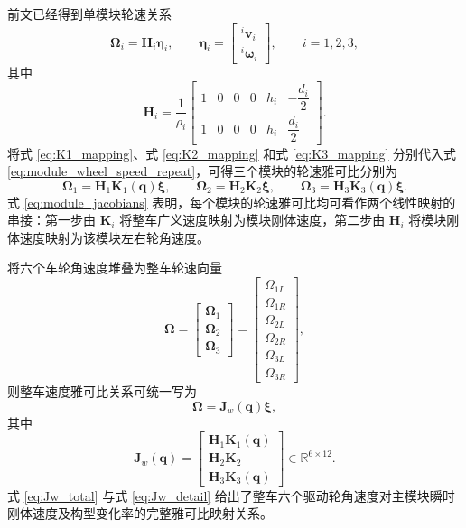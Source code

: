 前文已经得到单模块轮速关系
\begin{equation}
\boldsymbol\Omega_i=\mathbf H_i\boldsymbol\eta_i,
\qquad
\boldsymbol\eta_i=
\begin{bmatrix}
{}^{i}\mathbf v_i\\
{}^{i}\boldsymbol\omega_i
\end{bmatrix},
\qquad i=1,2,3,
\label{eq:module_wheel_speed_repeat}
\end{equation}
其中
\begin{equation}
\mathbf H_i
=
\frac{1}{\rho_i}
\begin{bmatrix}
1 & 0 & 0 & 0 & h_i & -\dfrac{d_i}{2}\\[4pt]
1 & 0 & 0 & 0 & h_i & \dfrac{d_i}{2}
\end{bmatrix}.
\label{eq:Hi_repeat}
\end{equation}
将式 \eqref{eq:K1_mapping}、式 \eqref{eq:K2_mapping} 和式 \eqref{eq:K3_mapping} 分别代入式 \eqref{eq:module_wheel_speed_repeat}，可得三个模块的轮速雅可比分别为
\begin{equation}
\boldsymbol\Omega_1
=
\mathbf H_1\mathbf K_1(\mathbf q)\boldsymbol\xi,
\qquad
\boldsymbol\Omega_2
=
\mathbf H_2\mathbf K_2\boldsymbol\xi,
\qquad
\boldsymbol\Omega_3
=
\mathbf H_3\mathbf K_3(\mathbf q)\boldsymbol\xi.
\label{eq:module_jacobians}
\end{equation}
式 \eqref{eq:module_jacobians} 表明，每个模块的轮速雅可比均可看作两个线性映射的串接：第一步由 $\mathbf K_i$ 将整车广义速度映射为模块刚体速度，第二步由 $\mathbf H_i$ 将模块刚体速度映射为该模块左右轮角速度。

将六个车轮角速度堆叠为整车轮速向量
\begin{equation}
\boldsymbol\Omega
=
\begin{bmatrix}
\boldsymbol\Omega_1\\
\boldsymbol\Omega_2\\
\boldsymbol\Omega_3
\end{bmatrix}
=
\begin{bmatrix}
\Omega_{1L}\\
\Omega_{1R}\\
\Omega_{2L}\\
\Omega_{2R}\\
\Omega_{3L}\\
\Omega_{3R}
\end{bmatrix},
\label{eq:Phi_stack}
\end{equation}
则整车速度雅可比关系可统一写为
\begin{equation}
\boldsymbol\Omega
=
\mathbf J_w(\mathbf q)\boldsymbol\xi,
\label{eq:Jw_total}
\end{equation}
其中
\begin{equation}
\mathbf J_w(\mathbf q)=
\begin{bmatrix}
\mathbf H_1\mathbf K_1(\mathbf q)\\
\mathbf H_2\mathbf K_2\\
\mathbf H_3\mathbf K_3(\mathbf q)
\end{bmatrix}
\in \mathbb{R}^{6\times 12}.
\label{eq:Jw_detail}
\end{equation}
式 \eqref{eq:Jw_total} 与式 \eqref{eq:Jw_detail} 给出了整车六个驱动轮角速度对主模块瞬时刚体速度及构型变化率的完整雅可比映射关系。

